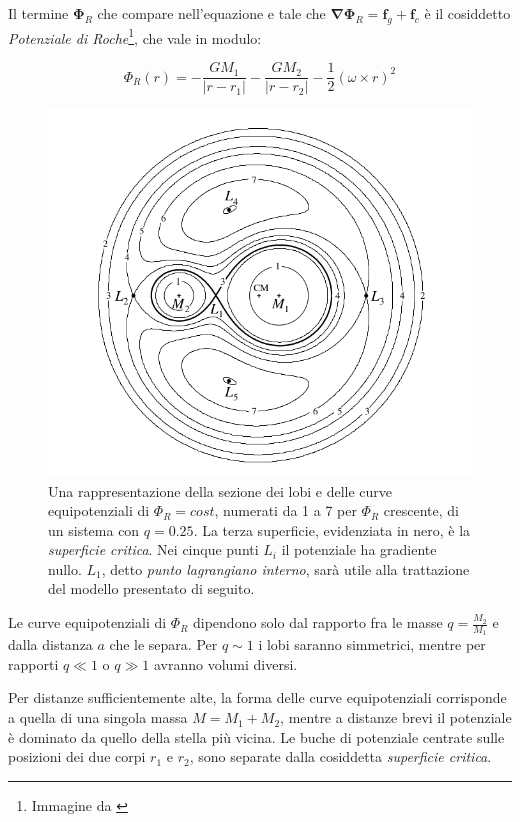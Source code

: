 \documentclass[a4paperbi]{article}
\begin{document}
	Il termine $\bm{\Phi}_R$ che compare nell'equazione e tale che $\bm{\nabla}\bm{\Phi}_R=\bm{f}_g+\bm{f}_c$ è il cosiddetto \textit{Potenziale di Roche}\footnote{Immagine da \cite{FrankKingRaineAccretionPower}}, che vale in modulo:

	\begin{equation}
		\Phi_R(\textit{r})=-\frac{GM_1}{\vert\textit{r}-\textit{r}_1\vert}-\frac{GM_2}{\vert\textit{r}-\textit{r}_2\vert}-\frac{1}{2}(\omega\times\textit{r})^2
	\end{equation}
	
	\begin{figure}[H]
		\centering
		\includegraphics[width=0.8\linewidth]{RocheEquipotential}
		\caption{Una rappresentazione della sezione dei lobi e delle curve equipotenziali di $\Phi_R=cost$, numerati da 1 a 7 per $\Phi_R$ crescente, di un sistema con $q=0.25$. La terza superficie, evidenziata in nero, è la \textit{superficie critica}. Nei cinque punti $L_i$ il potenziale ha gradiente nullo. $L_1$, detto \textit{punto lagrangiano interno}, sarà utile alla trattazione del modello presentato di seguito.}
		\label{fig:rocheequipotential}
	\end{figure}

	Le curve equipotenziali di $\Phi_R$ dipendono solo dal rapporto fra le masse $q=\frac{M_2}{M_1}$ e dalla distanza $a$ che le separa. Per $q\sim1$ i lobi saranno simmetrici, mentre per rapporti $q\ll1$ o $q\gg1$ avranno volumi diversi.

	Per distanze sufficientemente alte, la forma delle curve equipotenziali corrisponde a quella di una singola massa $M=M_1+M_2$, mentre a distanze brevi il potenziale è dominato da quello della stella più vicina. Le buche di potenziale centrate sulle posizioni dei due corpi $\textit{r}_1$ e $\textit{r}_2$, sono separate dalla cosiddetta \textit{superficie critica}.
	
\end{document}
